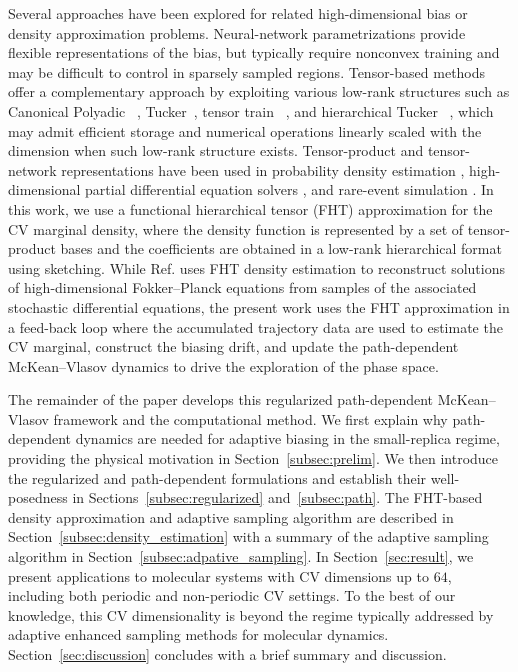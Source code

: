 \documentclass[a4paper,fleqn]{cas-sc}
\theoremstyle{definition}
\begin{document}
Several approaches have been explored for related high-dimensional bias or density approximation problems. Neural-network parametrizations \cite{galvelis2017neural,zhang2018reinforced,schneider2017stochastic,wang2022data} provide flexible representations of the bias, but typically require nonconvex training and may be difficult to control in sparsely sampled regions. Tensor-based methods offer a complementary approach by exploiting various low-rank structures such as Canonical Polyadic ~\cite{carroll1970analysis}, Tucker~\cite{tucker1966some}, tensor train ~\cite{oseledets2011tensor}, and hierarchical Tucker ~\cite{hackbusch2019hierarchical}, which may admit efficient storage and numerical operations linearly scaled with the dimension when such low-rank structure exists. Tensor-product and tensor-network representations have been used in probability density estimation \cite{Novikov_Panov_PMLR_2021, YoonHaeng_Jeremy_ACHA_2023,tang_generative_2023,tang2024solving},  high-dimensional partial differential equation solvers \cite{
Khoromskij_Schwab_SISC_2011,bachmayr_tensor_2016,Einkemmer_Joseph_JCP_2021, Tang_Collis_SISC_2025, wang2025tensor}, and rare-event simulation \cite{Chen_Hoskins_JCP_2023}. In this work, we use a functional hierarchical tensor (FHT) approximation \cite{tang2024solving} for the CV marginal density, where the density function is represented by a set of tensor-product bases and the coefficients are obtained in a low-rank hierarchical format using sketching. 
While Ref. \cite{tang2024solving} uses FHT density estimation to reconstruct solutions of high-dimensional Fokker--Planck equations from samples of the associated stochastic differential equations, 
the present work uses the FHT approximation in a feed-back loop where the accumulated trajectory data are used to estimate the CV marginal, construct the biasing drift, and update the path-dependent McKean--Vlasov dynamics to drive the exploration of the phase space. 


The remainder of the paper develops this regularized path-dependent McKean--Vlasov framework and the computational method. 
We first explain why path-dependent dynamics are needed for adaptive biasing in the small-replica regime, providing the physical motivation in Section~\ref{subsec:prelim}. 
We then introduce the regularized and path-dependent formulations and establish their well-posedness in Sections~\ref{subsec:regularized} and~\ref{subsec:path}. 
The FHT-based density approximation and adaptive sampling algorithm are described in Section~\ref{subsec:density_estimation} with a summary of  the adaptive sampling algorithm in Section~\ref{subsec:adpative_sampling}. 
In Section~\ref{sec:result}, we present applications to molecular systems with CV dimensions up to \(64\), including both periodic and non-periodic CV settings. To the best of our knowledge, this CV dimensionality is beyond the regime typically addressed by adaptive enhanced sampling methods for molecular dynamics. 
Section~\ref{sec:discussion} concludes with a brief summary and discussion.
\end{document}
